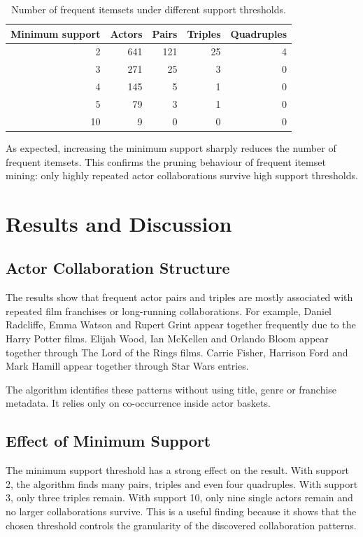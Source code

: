 \documentclass[11pt,a4paper]{article}
\begin{document}
\begin{table}[H]
\centering
\begin{tabular}{rrrrr}
\toprule
Minimum support & Actors & Pairs & Triples & Quadruples \\
\midrule
2 & 641 & 121 & 25 & 4 \\
3 & 271 & 25 & 3 & 0 \\
4 & 145 & 5 & 1 & 0 \\
5 & 79 & 3 & 1 & 0 \\
10 & 9 & 0 & 0 & 0 \\
\bottomrule
\end{tabular}
\caption{Number of frequent itemsets under different support thresholds.}
\end{table}

As expected, increasing the minimum support sharply reduces the number of frequent itemsets. This confirms the pruning behaviour of frequent itemset mining: only highly repeated actor collaborations survive high support thresholds.

\section{Results and Discussion}

\subsection{Actor Collaboration Structure}
The results show that frequent actor pairs and triples are mostly associated with repeated film franchises or long-running collaborations. For example, Daniel Radcliffe, Emma Watson and Rupert Grint appear together frequently due to the Harry Potter films. Elijah Wood, Ian McKellen and Orlando Bloom appear together through The Lord of the Rings films. Carrie Fisher, Harrison Ford and Mark Hamill appear together through Star Wars entries.

The algorithm identifies these patterns without using title, genre or franchise metadata. It relies only on co-occurrence inside actor baskets.

\subsection{Effect of Minimum Support}
The minimum support threshold has a strong effect on the result. With support 2, the algorithm finds many pairs, triples and even four quadruples. With support 3, only three triples remain. With support 10, only nine single actors remain and no larger collaborations survive. This is a useful finding because it shows that the chosen threshold controls the granularity of the discovered collaboration patterns.
\end{document}
